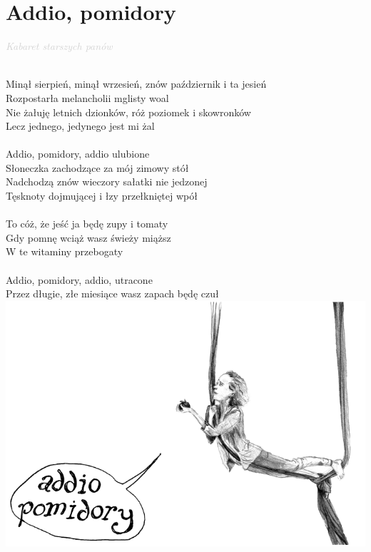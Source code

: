 \documentclass[a5paper, 10pt]{book}
\begin{document}
\section{Addio, pomidory}\textcolor{lightgray}{\textit{Kabaret starszych panów}}\\~\\
\begin{minipage}[t]{0.8\textwidth}
Minął sierpień, minął wrzesień, znów październik i ta jesień\\
Rozpostarła melancholii mglisty woal			\\
Nie żałuję letnich dzionków, róż poziomek i skowronków\\
Lecz jednego, jedynego jest mi żal				\\
\\
\hspace*{5mm}Addio, pomidory, addio ulubione				\\
\hspace*{5mm}Słoneczka zachodzące za mój zimowy stół		\\
\hspace*{5mm}Nadchodzą znów wieczory sałatki nie jedzonej\\
\hspace*{5mm}Tęsknoty dojmującej i łzy przełkniętej wpół\\
\\
\hspace*{5mm}To cóż, że jeść ja będę zupy i tomaty		\\
\hspace*{5mm}Gdy pomnę wciąż wasz świeży miąższ			\\
\hspace*{5mm}W te witaminy przebogaty\\
\\
\hspace*{5mm}Addio, pomidory, addio, utracone\\
\hspace*{5mm}Przez długie, złe miesiące wasz zapach będę czuł\\
\hspace*{0.35\textwidth}\includegraphics[height=0.6\textwidth]{images/addio_pomidory.png}\vspace*{-0.6\textwidth}

\end{minipage}
\end{document}

